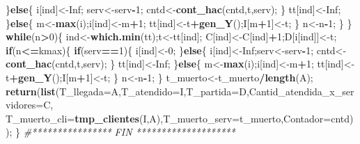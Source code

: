 \documentclass[]{article}
\newenvironment{Shaded}{\begin{snugshade}}{\end{snugshade}}
\newcommand{\KeywordTok}[1]{\textcolor[rgb]{0.13,0.29,0.53}{\textbf{#1}}}
\newcommand{\DataTypeTok}[1]{\textcolor[rgb]{0.13,0.29,0.53}{#1}}
\newcommand{\DecValTok}[1]{\textcolor[rgb]{0.00,0.00,0.81}{#1}}
\newcommand{\CommentTok}[1]{\textcolor[rgb]{0.56,0.35,0.01}{\textit{#1}}}
\newcommand{\OtherTok}[1]{\textcolor[rgb]{0.56,0.35,0.01}{#1}}
\newcommand{\ControlFlowTok}[1]{\textcolor[rgb]{0.13,0.29,0.53}{\textbf{#1}}}
\newcommand{\OperatorTok}[1]{\textcolor[rgb]{0.81,0.36,0.00}{\textbf{#1}}}
\newcommand{\NormalTok}[1]{#1}
\begin{document}
\begin{Shaded}
\begin{Highlighting}[]
\NormalTok{        \}}\ControlFlowTok{else}\NormalTok{\{}
\NormalTok{          i[ind]<-}\OtherTok{Inf}\NormalTok{;}
\NormalTok{          serv<-serv}\OperatorTok{-}\DecValTok{1}\NormalTok{;}
\NormalTok{          cntd<-}\KeywordTok{cont_hac}\NormalTok{(cntd,t,serv);}
\NormalTok{        \}}
\NormalTok{        tt[ind]<-}\OtherTok{Inf}\NormalTok{;}
\NormalTok{      \}}\ControlFlowTok{else}\NormalTok{\{}
\NormalTok{        m<-}\KeywordTok{max}\NormalTok{(i);i[ind]<-m}\OperatorTok{+}\DecValTok{1}\NormalTok{;}
\NormalTok{        tt[ind]<-t}\OperatorTok{+}\KeywordTok{gen_Y}\NormalTok{();I[m}\OperatorTok{+}\DecValTok{1}\NormalTok{]<-t;}
\NormalTok{      \}}
\NormalTok{      n<-n}\OperatorTok{-}\DecValTok{1}\NormalTok{;}
\NormalTok{    \}}
\NormalTok{  \}}
  \ControlFlowTok{while}\NormalTok{(n}\OperatorTok{>}\DecValTok{0}\NormalTok{)\{}
\NormalTok{    ind<-}\KeywordTok{which.min}\NormalTok{(tt);t<-tt[ind];}
\NormalTok{    C[ind]<-C[ind]}\OperatorTok{+}\DecValTok{1}\NormalTok{;D[i[ind]]<-t;}
    \ControlFlowTok{if}\NormalTok{(n}\OperatorTok{<=}\NormalTok{kmax)\{}
      \ControlFlowTok{if}\NormalTok{(serv}\OperatorTok{==}\DecValTok{1}\NormalTok{)\{}
\NormalTok{        i[ind]<-}\DecValTok{0}\NormalTok{;}
\NormalTok{      \}}\ControlFlowTok{else}\NormalTok{\{}
\NormalTok{        i[ind]<-}\OtherTok{Inf}\NormalTok{;serv<-serv}\OperatorTok{-}\DecValTok{1}\NormalTok{;}
\NormalTok{        cntd<-}\KeywordTok{cont_hac}\NormalTok{(cntd,t,serv);}
\NormalTok{      \}}
\NormalTok{      tt[ind]<-}\OtherTok{Inf}\NormalTok{;}
\NormalTok{    \}}\ControlFlowTok{else}\NormalTok{\{}
\NormalTok{      m<-}\KeywordTok{max}\NormalTok{(i);i[ind]<-m}\OperatorTok{+}\DecValTok{1}\NormalTok{;}
\NormalTok{      tt[ind]<-t}\OperatorTok{+}\KeywordTok{gen_Y}\NormalTok{();I[m}\OperatorTok{+}\DecValTok{1}\NormalTok{]<-t;}
\NormalTok{    \}}
\NormalTok{    n<-n}\OperatorTok{-}\DecValTok{1}\NormalTok{;}
\NormalTok{  \}}
\NormalTok{  t_muerto<-t_muerto}\OperatorTok{/}\KeywordTok{length}\NormalTok{(A);}
  \KeywordTok{return}\NormalTok{(}\KeywordTok{list}\NormalTok{(}\DataTypeTok{T_llegada=}\NormalTok{A,}\DataTypeTok{T_atendido=}\NormalTok{I,}\DataTypeTok{T_partida=}\NormalTok{D,}\DataTypeTok{Cantid_atendida_x_servidores=}\NormalTok{C,}
            \DataTypeTok{T_muerto_cli=}\KeywordTok{tmp_clientes}\NormalTok{(I,A),}\DataTypeTok{T_muerto_serv=}\NormalTok{t_muerto,}\DataTypeTok{Contador=}\NormalTok{cntd));}
\NormalTok{\}}
\CommentTok{#****************  FIN  ********************}
\end{Highlighting}
\end{Shaded}
\end{document}
